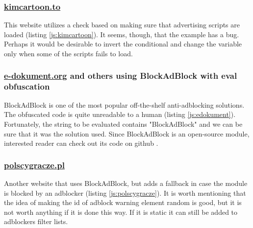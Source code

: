 
                       
\subsubsection{\url{kimcartoon.to}}
This website utilizes a check based on making sure that advertising scripts
are loaded (listing \ref{js:kimcartoon}). It seems, though, that the example has a bug.
Perhaps it would be desirable to invert the conditional and change the variable
only when some of the scripts fails to load.


                       
\subsubsection{\url{e-dokument.org} and others using BlockAdBlock with eval obfuscation}
BlockAdBlock is one of the most popular off-the-shelf anti-adblocking solutions.
The obfuscated code is quite unreadable to a human (listing \ref{js:edokument}).
Fortunately, the string to be evaluated contains "BlockAdBlock" and we can be sure that it was
the solution used. Since BlockAdBlock is an open-source module, interested reader can check 
out its code on github \cite{github:blockadblock}.



\subsubsection{\url{polscygracze.pl}}
Another website that uses BlockAdBlock, but adds a fallback in case the module is blocked
by an adblocker (listing \ref{js:polscygracze}). It is worth mentioning that the idea of 
making the id of adblock warning element random is good, but it is not worth anything 
if it is done this way. If it is static it can still be added to adblockers filter lists.
                       


